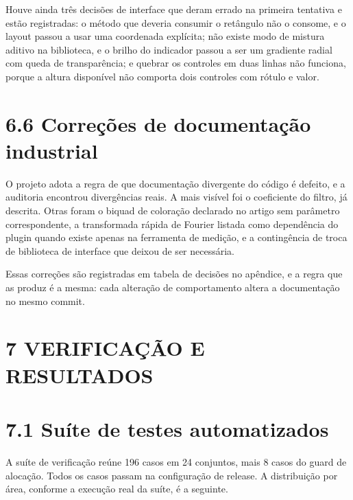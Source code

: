 \documentclass[12pt,a4paper]{article}
\begin{document}
Houve ainda três decisões de interface que deram errado na primeira tentativa e estão registradas: o método que deveria consumir o retângulo não o consome, e o layout passou a usar uma coordenada explícita; não existe modo de mistura aditivo na biblioteca, e o brilho do indicador passou a ser um gradiente radial com queda de transparência; e quebrar os controles em duas linhas não funciona, porque a altura disponível não comporta dois controles com rótulo e valor.


\section*{6.6 Correções de documentação industrial}

O projeto adota a regra de que documentação divergente do código é defeito, e a auditoria encontrou divergências reais. A mais visível foi o coeficiente do filtro, já descrita. Otras foram o biquad de coloração declarado no artigo sem parâmetro correspondente, a transformada rápida de Fourier listada como dependência do plugin quando existe apenas na ferramenta de medição, e a contingência de troca de biblioteca de interface que deixou de ser necessária.


Essas correções são registradas em tabela de decisões no apêndice, e a regra que as produz é a mesma: cada alteração de comportamento altera a documentação no mesmo commit.


\section*{7 VERIFICAÇÃO E RESULTADOS}

\section*{7.1 Suíte de testes automatizados}

A suíte de verificação reúne 196 casos em 24 conjuntos, mais 8 casos do guard de alocação. Todos os casos passam na configuração de release. A distribuição por área, conforme a execução real da suíte, é a seguinte.
\end{document}
